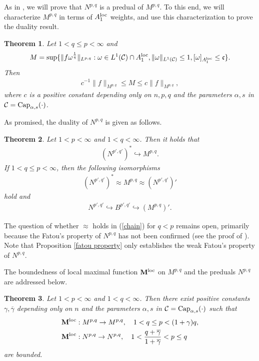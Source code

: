 \documentclass[10pt,reqno]{amsart}
\newtheorem{theorem}{Theorem}[section]
\numberwithin{equation}{section}
\begin{document}
As in \cite{OP}, we will prove that $N^{p,q}$ is a predual of $M^{p,q}$. To this end, we will characterize $M^{p,q}$ in terms of $A_{1}^{\rm loc}$ weights, and use this characterization to prove the duality result. 
\begin{theorem}\label{char M}
Let $1<q\leq p<\infty$ and
\begin{align}\label{M char}
M=\sup\{\|f\omega^{\frac{1}{q}}\|_{L^{p,q}}:\omega\in L^{1}(\mathcal{C})\cap A_{1}^{\rm loc},\|\omega\|_{L^{1}(\mathcal{C})}\leq 1,[\omega]_{A_{1}^{\rm loc}}\leq\mathfrak{c}\}.
\end{align}
Then 
\begin{align*}
c^{-1}\|f\|_{M^{p,q}}\leq M\leq c\|f\|_{M^{p,q}},
\end{align*}
where $c$ is a positive constant depending only on $n,p,q$ and the parameters $\alpha,s$ in $\mathcal{C}={\rm Cap}_{\alpha,s}(\cdot)$.
\end{theorem}

As promised, the duality of $N^{p,q}$ is given as follows.
\begin{theorem}\label{dual N}
Let $1<p<\infty$ and $1<q<\infty$. Then it holds that 
\begin{align}\label{first predual N}
(N^{p',q'})^{\ast}\hookrightarrow M^{p,q}.
\end{align}
If $1<q\leq p<\infty$, then the following isomorphisms
\begin{align}\label{predual}
(N^{p',q'})^{\ast}\approx M^{p,q}\approx(N^{p',q'})'
\end{align}
hold and 
\begin{align}\label{chain}
N^{p',q'}\hookrightarrow B^{p',q'}\hookrightarrow (M^{p,q})'.
\end{align}
\end{theorem}
The question of whether $\approx$ holds in (\ref{chain}) for $q < p$ remains open, primarily because the Fatou's property of $N^{p,q}$ has not been confirmed (see the proof of \cite[Theorem 5.3]{OP}). Note that Proposition \ref{fatou property} only establishes the weak Fatou's property of $N^{p,q}$.

The boundedness of local maximal function ${\bf M}^{\rm loc}$ on $M^{p,q}$ and the preduals $N^{p,q}$ are addressed below.
\begin{theorem}\label{maximal}
Let $1<p<\infty$ and $1<q<\infty$. Then there exist positive constants $\gamma,\overline{\gamma}$ depending only on $n$ and the parameters $\alpha,s$ in $\mathcal{C}={\rm Cap}_{\alpha,s}(\cdot)$ such that 
\begin{align}
{\bf M}^{\rm loc}&:M^{p,q}\rightarrow M^{p,q},\quad 1<q\leq p<(1+\gamma)q,\label{boundedness 1}\\
{\bf M}^{\rm loc}&:N^{p,q}\rightarrow N^{p,q},\quad 1<\frac{q+\overline{\gamma}}{1+\overline{\gamma}}<p\leq q\label{boundedness 2}
\end{align}
are bounded.
\end{theorem}
\end{document}
